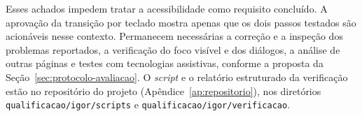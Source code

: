 Esses achados impedem tratar a acessibilidade como requisito concluído. A aprovação da transição por teclado mostra apenas que os dois passos testados são acionáveis nesse contexto. Permanecem necessárias a correção e a inspeção dos problemas reportados, a verificação do foco visível e dos diálogos, a análise de outras páginas e testes com tecnologias assistivas, conforme a proposta da Seção~\ref{sec:protocolo-avaliacao}. O \textit{script} e o relatório estruturado da verificação estão no repositório do projeto (Apêndice~\ref{ap:repositorio}), nos diretórios \texttt{qualificacao/igor/scripts} e \texttt{qualificacao/igor/verificacao}.
